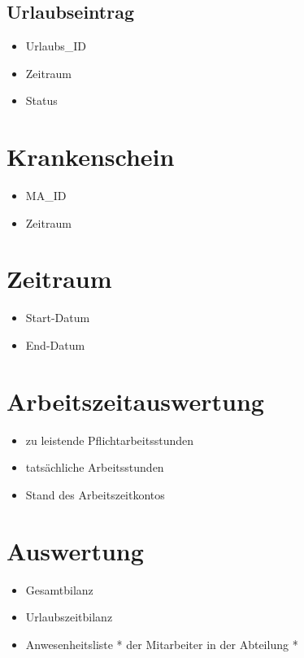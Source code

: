 \subsection{Urlaubseintrag}
\begin{itemize}[label=+]
\item[] Urlaubs\_ID
\item Zeitraum
\item Status
\end{itemize}
\section{Krankenschein}
\begin{itemize}[label=+]
\item[] MA\_ID
\item Zeitraum
\end{itemize}
\section{Zeitraum}
\begin{itemize}[label=+]
\item[] Start-Datum
\item End-Datum
\end{itemize}

\section{Arbeitszeitauswertung}
\begin{itemize}[label=+]
\item[] zu leistende Pflichtarbeitsstunden
\item tatsächliche Arbeitsstunden
\item Stand des Arbeitszeitkontos
\end{itemize}

\section{Auswertung}
\begin{itemize}[label=+]
\item[] Gesamtbilanz
\item Urlaubszeitbilanz
\item Anwesenheitsliste * der Mitarbeiter in der Abteilung *
\end{itemize}

